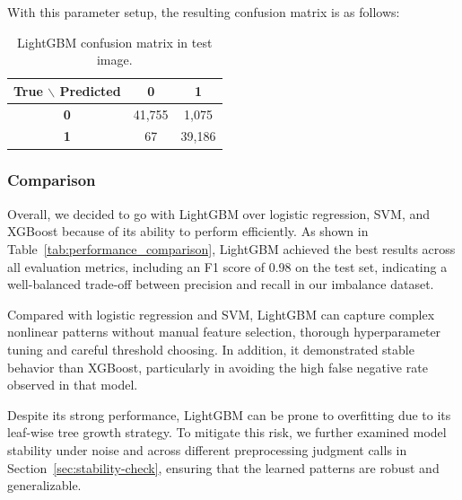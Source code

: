 \documentclass[10pt,letterpaper]{article}
\begin{document}

With this parameter setup, the resulting confusion matrix is as follows:
\begin{table}[h!]
\centering

\label{tab:lightgbm_confusion_matrix}
\begin{tabular}{c|cc}
\hline
\textbf{True} $\backslash$ \textbf{Predicted} & \textbf{0} & \textbf{1} \\
\hline
\textbf{0} & 41,755 & 1,075 \\
\textbf{1} & 67    & 39,186 \\
\hline
\end{tabular}
\caption{LightGBM confusion matrix in test image.}
\end{table}
\subsubsection{Comparison}

Overall, we decided to go with LightGBM over logistic regression, SVM, and XGBoost because of its ability to perform efficiently. As shown in Table~\ref{tab:performance_comparison}, LightGBM achieved the best results across all evaluation metrics, including an F1 score of 0.98 on the test set, indicating a well-balanced trade-off between precision and recall in our imbalance dataset.


Compared with logistic regression and SVM, LightGBM can capture complex nonlinear patterns without manual feature selection, thorough hyperparameter tuning and careful threshold choosing. In addition, it demonstrated stable behavior than XGBoost, particularly in avoiding the high false negative rate observed in that model.

Despite its strong performance, LightGBM can be prone to overfitting due to its leaf-wise tree growth strategy. To mitigate this risk, we further examined model stability under noise and across different preprocessing judgment calls in Section~\ref{sec:stability-check}, ensuring that the learned patterns are robust and generalizable.
\end{document}
